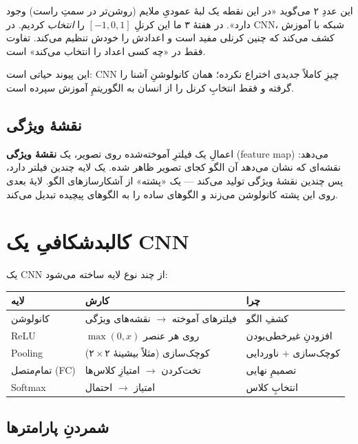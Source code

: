 \documentclass[12pt,a4paper]{article}
\begin{document}
این عددِ $۲$ می‌گوید «در این نقطه یک لبهٔ عمودیِ ملایم (روشن‌تر در سمتِ راست) وجود دارد». در هفتهٔ ۳ ما این کرنلِ $[-1,0,1]$ را \emph{انتخاب} کردیم. در CNN، شبکه با آموزش کشف می‌کند که چنین کرنلی مفید است و اعدادش را خودش تنظیم می‌کند. تفاوت فقط در «چه کسی اعداد را انتخاب می‌کند» است.

\begin{nokte}
این پیوند حیاتی است: CNN چیزِ کاملاً جدیدی اختراع نکرده؛ همان کانولوشنِ آشنا را گرفته و فقط انتخابِ کرنل را از انسان به الگوریتمِ آموزش سپرده است.
\end{nokte}

\subsection{نقشهٔ ویژگی}

اعمالِ یک فیلترِ آموخته‌شده روی تصویر، یک \textbf{نقشهٔ ویژگی} (feature map) می‌دهد: نقشه‌ای که نشان می‌دهد آن الگو کجای تصویر ظاهر شده. یک لایه چندین فیلتر دارد، پس چندین نقشهٔ ویژگی تولید می‌کند — یک «پشته» از آشکارسازهای الگو. لایهٔ بعدی روی این پشته کانولوشن می‌زند و الگوهای ساده را به الگوهای پیچیده تبدیل می‌کند.

\section{کالبدشکافیِ یک CNN}

یک CNN از چند نوع لایه ساخته می‌شود:

\begin{center}
\begin{tabular}{@{}lll@{}}
\hline
\textbf{لایه} & \textbf{کارش} & \textbf{چرا} \\
\hline
کانولوشن & فیلترهای آموخته $\rightarrow$ نقشه‌های ویژگی & کشفِ الگو \\
ReLU & $\max(0,x)$ روی هر عنصر & افزودنِ غیرخطی‌بودن \\
Pooling & کوچک‌سازی (مثلاً بیشینهٔ $۲\times۲$) & کوچک‌سازی + ناوردایی \\
تمام‌متصل (FC) & تخت‌کردن $\rightarrow$ امتیازِ کلاس‌ها & تصمیمِ نهایی \\
Softmax & امتیاز $\rightarrow$ احتمال & انتخابِ کلاس \\
\hline
\end{tabular}
\end{center}

\subsection{شمردنِ پارامترها}
\end{document}
